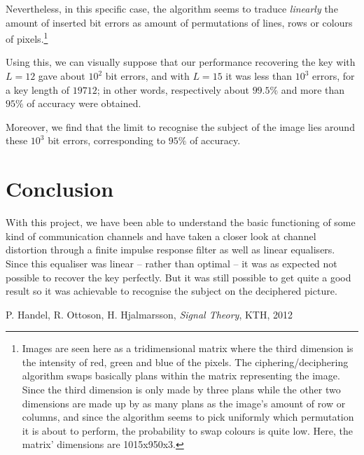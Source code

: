 \documentclass[twocolumn, 12pt]{IEEEtran}
\begin{document}
Nevertheless, in this specific case, the algorithm seems to traduce \textit{linearly} the amount of inserted bit errors as amount of permutations of lines, rows or colours of pixels.\footnote{Images are seen here as a tridimensional matrix where the third dimension is the intensity of red, green and blue of the pixels. The ciphering/deciphering algorithm swaps basically plans within the matrix representing the image. Since the third dimension is only made by three plans while the other two dimensions are made up by as many plans as the image's amount of row or columns, and since the algorithm seems to pick uniformly which permutation it is about to perform, the probability to swap colours is quite low. Here, the matrix' dimensions are 1015x950x3.}

Using this, we can visually suppose that our performance recovering the key with $L=12$ gave about $10^2$ bit errors, and with $L=15$ it was less than $10^3$ errors, for a key length of ${19712}$; in other words, respectively about $99.5\%$ and more than $95\%$ of accuracy were obtained.

Moreover, we find that the limit to recognise the subject of the image lies around these $10^{3}$ bit errors, corresponding to $95\%$ of accuracy. 


\section{Conclusion}

With this project, we have been able to understand the basic functioning of some kind of communication channels and have taken a closer look at channel distortion through a finite impulse response filter as well as linear equalisers. Since this equaliser was linear -- rather than optimal -- it was as expected not possible to recover the key perfectly. But it was still possible to get quite a good result so it was achievable to recognise the subject on the deciphered picture.



\begin{thebibliography}{1}

P. Handel, R. Ottoson, H. Hjalmarsson, \emph{Signal Theory}, KTH, 2012

\end{thebibliography}

\balance
\end{document}
